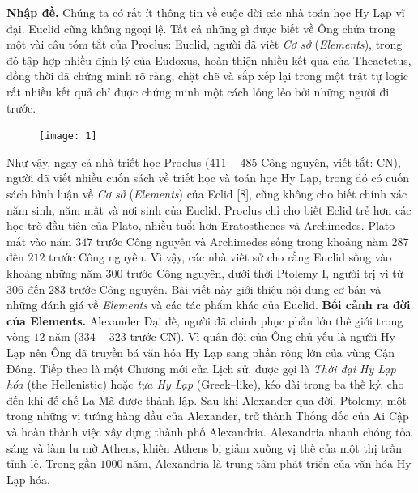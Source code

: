 \begin{multicols}{2}
	\textbf{\color{lichsutoanhoc}Nhập đề.}
	Chúng ta có rất ít thông tin về cuộc đời các nhà toán học Hy Lạp vĩ đại. Euclid cũng không ngoại lệ. Tất cả những gì được biết về Ông chứa trong một vài câu tóm tắt của Proclus: Euclid, người đã viết \textit{Cơ sở} (\textit{Elements}), trong đó tập hợp nhiều định lý của Eudoxus, hoàn thiện nhiều kết quả của Theaetetus, đồng thời đã chứng minh rõ ràng, chặt chẽ và sắp xếp lại trong một trật tự logic rất nhiều kết quả chỉ được chứng minh một cách lỏng lẻo bởi những người đi trước.
		\begin{figure}[H]
		\vspace*{-5pt}
		\centering
		\captionsetup{labelformat= empty, justification=centering}
		\texttt{[image: 1]}
		\vspace*{-10pt}
	\end{figure}
	Như vậy, ngay cả nhà triết học Proclus ($411-485$ Công nguyên, viết tắt: CN), người đã viết nhiều cuốn sách về triết học và toán học Hy Lạp, trong đó có cuốn sách bình luận về \textit{Cơ sở} (\textit{Elements}) của Eclid [$8$], cũng không cho biết chính xác năm sinh, năm mất và nơi sinh của Euclid. Proclus chỉ cho biết Eclid trẻ hơn các học trò đầu tiên của Plato, nhiều tuổi hơn Eratosthenes và Archimedes. Plato mất vào năm $347$ trước Công nguyên và Archimedes sống trong khoảng năm $287$ đến $212$ trước Công nguyên. Vì vậy, các nhà viết sử cho rằng Euclid sống vào khoảng những năm $300$ trước Công nguyên, dưới thời Ptolemy I, người trị vì từ $306$ đến $283$ trước Công nguyên. 
	\vskip 0.1cm
	Bài viết này giới thiệu nội dung cơ bản và những đánh giá về \textit{Elements} và các tác phẩm khác của Euclid. 
	\vskip 0.1cm
	\textbf{\color{lichsutoanhoc}Bối cảnh ra đời của Elements.}
	Alexander Đại đế, người đã chinh phục phần lớn thế giới trong vòng $12$ năm ($334-323$ trước CN). Vì quân đội của Ông chủ yếu là người Hy Lạp nên Ông đã truyền bá văn hóa Hy Lạp sang phần rộng lớn của vùng Cận Đông. Tiếp theo là một Chương mới của Lịch sử, được gọi là \textit{Thời đại Hy Lạp hóa} (the Hellenistic) hoặc \textit{tựa Hy Lạp} (Greek--like), kéo dài trong ba thế kỷ, cho đến khi đế chế La Mã được thành lập.
	\vskip 0.1cm
	Sau khi Alexander qua đời, Ptolemy, một trong những vị tướng hàng đầu của Alexander, trở thành Thống đốc của Ai Cập và hoàn thành việc xây dựng thành phố Alexandria. Alexandria nhanh chóng tỏa sáng và làm lu mờ Athens, khiến Athens bị giảm xuống vị thế của một thị trấn tỉnh lẻ. Trong gần $1000$ năm, Alexandria là trung tâm phát triển của văn hóa Hy Lạp hóa.

\end{multicols}
